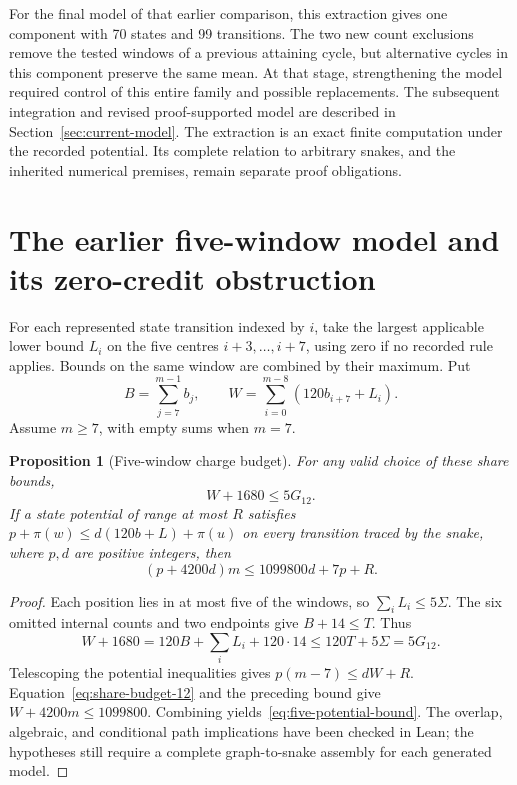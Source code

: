 \documentclass[11pt,a4paper]{article}
\newtheorem{proposition}[theorem]{Proposition}
\theoremstyle{definition}
\theoremstyle{remark}
\begin{document}
For the final model of that earlier comparison, this extraction gives one component with 70 states and 99 transitions. The two new count exclusions remove the tested windows of a previous attaining cycle, but alternative cycles in this component preserve the same mean. At that stage, strengthening the model required control of this entire family and possible replacements. The subsequent integration and revised proof-supported model are described in Section~\ref{sec:current-model}. The extraction is an exact finite computation under the recorded potential. Its complete relation to arbitrary snakes, and the inherited numerical premises, remain separate proof obligations.


\section{The earlier five-window model and its zero-credit obstruction}\label{app:earlier-five-model}\label{sec:current-charge}
For each represented state transition indexed by $i$, take the largest applicable lower bound $L_i$ on the five centres $i+3,\ldots,i+7$, using zero if no recorded rule applies. Bounds on the same window are combined by their maximum. Put
\[
B=\sum_{j=7}^{m-1}b_j,\qquad W=\sum_{i=0}^{m-8}(120b_{i+7}+L_i).
\]
Assume $m\ge7$, with empty sums when $m=7$.

\begin{proposition}[Five-window charge budget]\label{prop:five-budget}
For any valid choice of these share bounds,
\[
W+1680\le5G_{12}.
\]
If a state potential of range at most $R$ satisfies $p+\pi(w)\le d(120b+L)+\pi(u)$ on every transition traced by the snake, where $p,d$ are positive integers, then
\begin{equation}\label{eq:five-potential-bound}
(p+4200d)m\le1099800d+7p+R.
\end{equation}
\end{proposition}
\begin{proof}
Each position lies in at most five of the windows, so $\sum_i L_i\le5\Sigma$. The six omitted internal counts and two endpoints give $B+14\le T$. Thus
\[
W+1680=120B+\sum_iL_i+120\cdot14\le120T+5\Sigma=5G_{12}.
\]
Telescoping the potential inequalities gives $p(m-7)\le dW+R$. Equation~\eqref{eq:share-budget-12} and the preceding bound give $W+4200m\le1099800$. Combining yields~\eqref{eq:five-potential-bound}. The overlap, algebraic, and conditional path implications have been checked in Lean; the hypotheses still require a complete graph-to-snake assembly for each generated model.
\end{proof}
\end{document}
